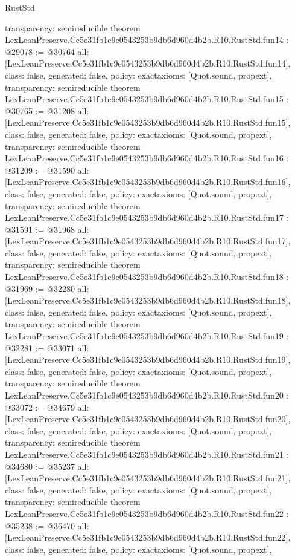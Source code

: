 \begin{lexlean}{RustStd}
\begin{coremodule}
{  transparency: semireducible
}
theorem LexLeanPreserve.Cc5e31fb1c9e0543253b9db6d960d4b2b.R10.RustStd.fun14 : @29078 := @30764 {
  all: [LexLeanPreserve.Cc5e31fb1c9e0543253b9db6d960d4b2b.R10.RustStd.fun14],
  class: false,
  generated: false,
  policy: exact{axioms: [Quot.sound, propext]},
  transparency: semireducible
}
theorem LexLeanPreserve.Cc5e31fb1c9e0543253b9db6d960d4b2b.R10.RustStd.fun15 : @30765 := @31208 {
  all: [LexLeanPreserve.Cc5e31fb1c9e0543253b9db6d960d4b2b.R10.RustStd.fun15],
  class: false,
  generated: false,
  policy: exact{axioms: [Quot.sound, propext]},
  transparency: semireducible
}
theorem LexLeanPreserve.Cc5e31fb1c9e0543253b9db6d960d4b2b.R10.RustStd.fun16 : @31209 := @31590 {
  all: [LexLeanPreserve.Cc5e31fb1c9e0543253b9db6d960d4b2b.R10.RustStd.fun16],
  class: false,
  generated: false,
  policy: exact{axioms: [Quot.sound, propext]},
  transparency: semireducible
}
theorem LexLeanPreserve.Cc5e31fb1c9e0543253b9db6d960d4b2b.R10.RustStd.fun17 : @31591 := @31968 {
  all: [LexLeanPreserve.Cc5e31fb1c9e0543253b9db6d960d4b2b.R10.RustStd.fun17],
  class: false,
  generated: false,
  policy: exact{axioms: [Quot.sound, propext]},
  transparency: semireducible
}
theorem LexLeanPreserve.Cc5e31fb1c9e0543253b9db6d960d4b2b.R10.RustStd.fun18 : @31969 := @32280 {
  all: [LexLeanPreserve.Cc5e31fb1c9e0543253b9db6d960d4b2b.R10.RustStd.fun18],
  class: false,
  generated: false,
  policy: exact{axioms: [Quot.sound, propext]},
  transparency: semireducible
}
theorem LexLeanPreserve.Cc5e31fb1c9e0543253b9db6d960d4b2b.R10.RustStd.fun19 : @32281 := @33071 {
  all: [LexLeanPreserve.Cc5e31fb1c9e0543253b9db6d960d4b2b.R10.RustStd.fun19],
  class: false,
  generated: false,
  policy: exact{axioms: [Quot.sound, propext]},
  transparency: semireducible
}
theorem LexLeanPreserve.Cc5e31fb1c9e0543253b9db6d960d4b2b.R10.RustStd.fun20 : @33072 := @34679 {
  all: [LexLeanPreserve.Cc5e31fb1c9e0543253b9db6d960d4b2b.R10.RustStd.fun20],
  class: false,
  generated: false,
  policy: exact{axioms: [Quot.sound, propext]},
  transparency: semireducible
}
theorem LexLeanPreserve.Cc5e31fb1c9e0543253b9db6d960d4b2b.R10.RustStd.fun21 : @34680 := @35237 {
  all: [LexLeanPreserve.Cc5e31fb1c9e0543253b9db6d960d4b2b.R10.RustStd.fun21],
  class: false,
  generated: false,
  policy: exact{axioms: [Quot.sound, propext]},
  transparency: semireducible
}
theorem LexLeanPreserve.Cc5e31fb1c9e0543253b9db6d960d4b2b.R10.RustStd.fun22 : @35238 := @36470 {
  all: [LexLeanPreserve.Cc5e31fb1c9e0543253b9db6d960d4b2b.R10.RustStd.fun22],
  class: false,
  generated: false,
  policy: exact{axioms: [Quot.sound, propext]},
}
\end{coremodule}
\end{lexlean}
